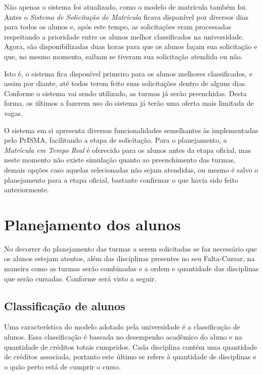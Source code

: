 \documentclass[graduacao,brazil]{ThesisPUC}
\begin{document}
Não apenas o sistema foi atualizado, como o modelo de matrícula também foi. Antes o \textit{Sistema de Solicitação de Matrícula} ficava disponível por diversos dias para todos os alunos e, após este tempo, as solicitações eram processadas respeitando a prioridade entre os alunos melhor classificados na universidade. Agora, são disponibilizadas duas horas para que os alunos façam sua solicitação e que, no mesmo momento, saibam se tiveram sua solicitação atendida ou não. 

Isto é, o sistema fica disponível primeiro para os alunos melhores classificados, e assim por diante, até todos terem feito suas solicitações dentro de alguns dias. Conforme o sistema vai sendo utilizado, as turmas já serão preenchidas. Desta forma, os últimos a fazerem uso do sistema já terão uma oferta mais limitada de vagas. 

O sistema em si apresenta diversas funcionalidades semelhantes às implementadas pelo PrISMA, facilitando a etapa de solicitação. Para o planejamento, a \textit{Matrícula em Tempo Real} é oferecido para os alunos antes da etapa oficial, mas neste momento não existe simulação quanto ao preenchimento das turmas, demais opções caso aquelas selecionadas não sejam atendidas, ou mesmo é salvo o planejamento para a etapa oficial, bastante confirmar o que havia sido feito anteriormente.

\section{Planejamento dos alunos}

No decorrer do planejamento das turmas a serem solicitadas se faz necessário que os alunos estejam atentos, além das disciplinas presentes no seu Falta-Cursar, na maneira como as turmas serão combinadas e a ordem e quantidade das disciplinas que serão cursadas. Conforme será visto a seguir.

\subsection{Classificação de alunos}

Uma característica do modelo adotado pela universidade é a classificação de alunos. Essa classificação é baseada no desempenho acadêmico do aluno e na quantidade de créditos totais cumpridos. Cada disciplina contém uma quantidade de créditos associada, portanto este último se refere à quantidade de disciplinas e o quão perto está de cumprir o curso. 
\end{document}
